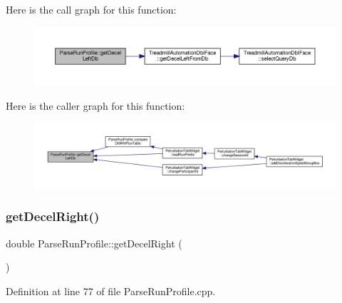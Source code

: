 Here is the call graph for this function\+:
\nopagebreak
\begin{figure}[H]
\begin{center}
\leavevmode
\includegraphics[width=350pt]{class_parse_run_profile_a4b1aad790977725a7daf4fff854b0cb6_cgraph}
\end{center}
\end{figure}
Here is the caller graph for this function\+:
\nopagebreak
\begin{figure}[H]
\begin{center}
\leavevmode
\includegraphics[width=350pt]{class_parse_run_profile_a4b1aad790977725a7daf4fff854b0cb6_icgraph}
\end{center}
\end{figure}
\mbox{\label{class_parse_run_profile_af21d7e6a341316569cf5905fe46a00b3}} 
\subsubsection{\texorpdfstring{get\+Decel\+Right()}{getDecelRight()}}
{\footnotesize\ttfamily double Parse\+Run\+Profile\+::get\+Decel\+Right (\begin{DoxyParamCaption}{ }\end{DoxyParamCaption})}



Definition at line 77 of file Parse\+Run\+Profile.\+cpp.

